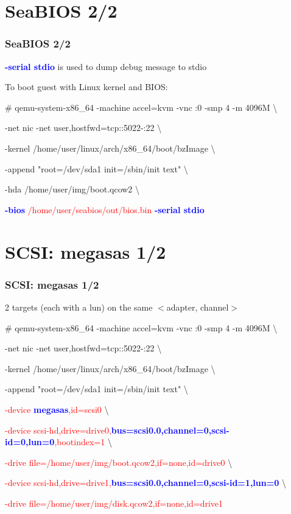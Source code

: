 \documentclass[aspectratio=169]{beamer}
\begin{document}
\section{SeaBIOS 2/2}
\begin{frame}
\frametitle{SeaBIOS 2/2}
{ \LARGE \textbf{\textcolor{blue}{-serial stdio}} is used to dump debug message to stdio}
\begin{block}{}

To boot guest with Linux kernel and BIOS: \newline

\# qemu-system-x86\_64 -machine accel=kvm -vnc :0 -smp 4 -m 4096M \textbackslash

-net nic -net user,hostfwd=tcp::5022-:22 \textbackslash

-kernel /home/user/linux/arch/x86\_64/boot/bzImage \textbackslash
	
-append "root=/dev/sda1 init=/sbin/init text" \textbackslash

-hda /home/user/img/boot.qcow2 \textbackslash

\textcolor{red}{\textbf{\textcolor{blue}{-bios}} /home/user/seabios/out/bios.bin \textbf{\textcolor{blue}{-serial stdio}}}

\end{block}
\end{frame}


\section{SCSI: megasas 1/2}
\begin{frame}
\frametitle{SCSI: megasas 1/2}
{\LARGE 2 targets (each with a lun) on the same $<$adapter, channel$>$}
\\
\begin{block}{}

\# qemu-system-x86\_64 -machine accel=kvm -vnc :0 -smp 4 -m 4096M \textbackslash

-net nic -net user,hostfwd=tcp::5022-:22 \textbackslash

-kernel /home/user/linux/arch/x86\_64/boot/bzImage \textbackslash
	
-append "root=/dev/sda1 init=/sbin/init text" \textbackslash

\textcolor{red}{-device \textbf{\textcolor{blue}{megasas}},id=scsi0} \textbackslash

\textcolor{red}{-device scsi-hd,drive=drive0,\textbf{\textcolor{blue}{bus=scsi0.0,channel=0,scsi-id=0,lun=0}},bootindex=1} \textbackslash
 
\textcolor{red}{-drive file=/home/user/img/boot.qcow2,if=none,id=drive0} \textbackslash

\textcolor{red}{-device scsi-hd,drive=drive1,\textbf{\textcolor{blue}{bus=scsi0.0,channel=0,scsi-id=1,lun=0}}} \textbackslash

\textcolor{red}{-drive file=/home/user/img/disk.qcow2,if=none,id=drive1}

\end{block}
\end{frame}
\end{document}
